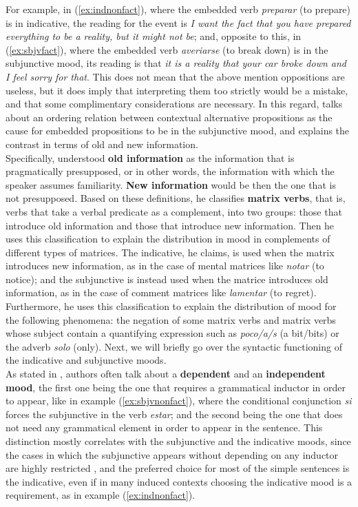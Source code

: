 For example, in (\ref{ex:indnonfact}), where the embedded verb \textit{preparar} (to prepare) is in indicative, the reading for the event is \textit{I want the fact that you have prepared everything to be a reality, but it might not be}; and, opposite to this, in (\ref{ex:sbjvfact}), where the embedded verb \textit{averiarse} (to break down) is in the subjunctive mood, its reading is that \textit{it is a reality that your car broke down and I feel sorry for that}. This does not mean that the above mention oppositions are useless, but it does imply that interpreting them too strictly would be a mistake, and that some complimentary considerations are necessary. In this regard, \citet{villalta2008mood} talks about an ordering relation between contextual alternative propositions as the cause for embedded propositions to be in the subjunctive mood, and \citet{mejias1998pragmatic} explains the contrast in terms of old and new information.\\ 

Specifically, \citet{mejias1998pragmatic} understood \textbf{old information} as the information that is pragmatically presupposed, or in other words, the information with which the speaker assumes familiarity. \textbf{New information} would be then the one that is not presupposed. Based on these definitions, he classifies \textbf{matrix verbs}, that is, verbs that take a verbal predicate as a complement, into two groups: those that introduce old information and those that introduce new information. Then he uses this classification to explain the distribution in mood in complements of different types of matrices. The indicative, he claims, is used when the matrix introduces new information, as in the case of mental matrices like \textit{notar} (to notice); and the subjunctive is instead used when the matrice introduces old information, as in the case of comment matrices like  \textit{lamentar} (to regret). Furthermore, he uses this classification to explain the distribution of mood for the following phenomena: the negation of some matrix verbs and matrix verbs whose subject contain a quantifying expression such as \textit{poco/a/s} (a bit/bits) or the adverb \textit{solo} (only). Next, we will briefly go over the syntactic functioning of the indicative and subjunctive moods.\\

As stated in \citet{espanola2010nueva}, authors often talk about a \textbf{dependent} and an \textbf{independent mood}, the first one being the one that requires a grammatical inductor in order to appear, like in example (\ref{ex:sbjvnonfact}), where the conditional conjunction \textit{si} forces the subjunctive in the verb \textit{estar}; and the second being the one that does not need any grammatical element in order to appear in the sentence. This distinction mostly correlates with the subjunctive and the indicative moods, since the cases in which the subjunctive appears without depending on any inductor are highly restricted \citep{espanola2010nueva}, and the preferred choice for most of the simple sentences is the indicative, even if in many induced contexts choosing the indicative mood is a requirement, as in example (\ref{ex:indnonfact}).\\

